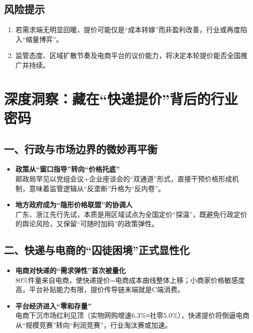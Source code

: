 \subsection{风险提示}
\begin{enumerate}[leftmargin=*, nosep]
  \item 若需求端无明显回暖，提价可能仅是“成本转嫁”而非盈利改善，行业或再度陷入“缩量博弈”。
  \item 监管态度、区域扩散节奏及电商平台的议价能力，将决定本轮提价能否全国推广并持续。
\end{enumerate}



\section{深度洞察：藏在“快递提价”背后的行业密码}

\subsection{一、行政与市场边界的微妙再平衡}
\begin{itemize}
  \item \textbf{政策从“窗口指导”转向“价格托底”}  \\
  邮政局罕见以党组会议+企业座谈会的“双通道”形式，直接干预价格形成机制，意味着监管逻辑从“反垄断”升格为“反内卷”。  
  \item \textbf{地方政府成为“隐形价格联盟”的协调人}  \\
  广东、浙江先行先试，本质是用区域试点为全国定价“探温”，既避免行政定价的舆论风险，又保留“可随时加码”的政策弹性。
\end{itemize}

\subsection{二、快递与电商的“囚徒困境”正式显性化}
\begin{itemize}
  \item \textbf{电商对快递的“需求弹性”首次被量化}  \\
  80\%件量来自电商，使快递提价=电商成本曲线整体上移；小商家价格敏感度高，平台补贴能力有限，提价传导链末端就是C端消费。
  \item \textbf{平台经济进入“零和存量”}  \\
  电商下沉市场红利见顶（实物网购增速6.3\%≈社零5.0\%），快递提价将倒逼电商从“规模竞赛”转向“利润竞赛”，行业淘汰赛或加速。
\end{itemize}

